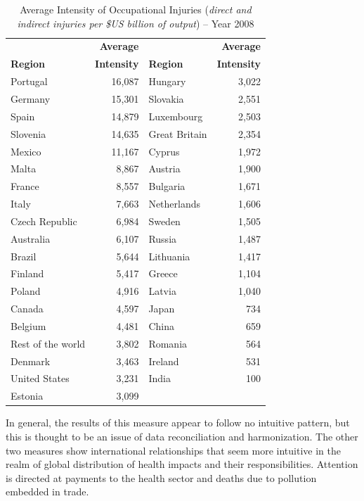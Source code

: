 \documentclass[a4paper,12pt, ]{article}
\begin{document}
\begin{table} %
\caption{Average Intensity of Occupational Injuries (\textit{direct and indirect injuries per \$US billion of output}) -- Year 2008} 
\begin{center}
\small \begin{tabular}{lrlr}
 & \textbf{Average} &  & \textbf{Average} \\ 
\textbf{Region} & \textbf{Intensity }& \textbf{Region} & \textbf{Intensity}\\ 
\hline
Portugal &  16,087  & Hungary &  3,022 \\ 
Germany &  15,301  & Slovakia &  2,551 \\ 
Spain &  14,879  & Luxembourg &  2,503 \\ 
Slovenia &  14,635  & Great Britain &  2,354 \\ 
Mexico &  11,167  & Cyprus &  1,972 \\ 
Malta &  8,867  & Austria &  1,900 \\ 
France &  8,557  & Bulgaria &  1,671 \\ 
Italy &  7,663  & Netherlands &  1,606 \\ 
Czech Republic &  6,984  & Sweden &  1,505 \\ 
Australia &  6,107  & Russia &  1,487 \\ 
Brazil &  5,644  & Lithuania &  1,417 \\ 
Finland &  5,417  & Greece &  1,104 \\ 
Poland &  4,916  & Latvia &  1,040 \\ 
Canada &  4,597  & Japan &  734 \\ 
Belgium &  4,481  & China &  659 \\ 
Rest of the world &  3,802  & Romania &  564 \\ 
Denmark &  3,463  & Ireland &  531 \\ 
United States &  3,231  & India &  100 \\ 
Estonia &  3,099  &  & \\
\hline
\end{tabular}
\label{tab01a} 
\end{center}
\end{table}
 
 In general, the results of this measure appear to follow no intuitive pattern, but this is thought to be an issue of data reconciliation and harmonization. The other two measures show international relationships that seem more intuitive in the realm of global distribution of health impacts and their responsibilities. Attention is directed at payments to the health sector and deaths due to pollution embedded in trade.
\end{document}
